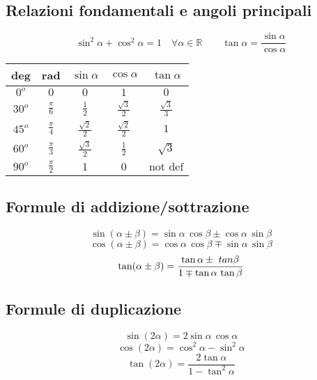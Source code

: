 \documentclass{article}
\begin{document}
  \subsection*{Relazioni fondamentali e angoli principali}
  \begin{equation*}
    \sin^2 \alpha + \cos^2 \alpha = 1 \quad \forall \alpha \in \mathbb{R}
    \qquad
    \tan\alpha = \frac{\sin\alpha}{\cos\alpha}
  \end{equation*}
  \renewcommand{\arraystretch}{1.5}
  \begin{center}
    \begin{tabular}{ | c | c | c | c | c | }
      \hline
      deg & rad & $\sin \alpha$ & $\cos\alpha$ & $\tan\alpha$ \\
      \hline
      $0^o$ & $0$ & $0$ & $1$ & $0$ \\
      $30^o$ & $\frac{\pi}{6}$ & $\frac{1}{2}$ & $\frac{\sqrt{3}}{2}$ & $\frac{\sqrt{3}}{3}$ \\
      $45^o$ & $\frac{\pi}{4}$ & $\frac{\sqrt{2}}{2}$ & $\frac{\sqrt{2}}{2}$ & $1$ \\
      $60^o$ & $\frac{\pi}{3}$ & $\frac{\sqrt{3}}{2}$ & $\frac{1}{2}$ & $\sqrt{3}$ \\
      $90^o$ & $\frac{\pi}{2}$ & $1$ & $0$ & $\text{not def}$ \\
      \hline
    \end{tabular}
  \end{center}
  \renewcommand{\arraystretch}{1}

  \subsection*{Formule di addizione/sottrazione}
  \begin{equation}
    \sin(\alpha\pm\beta) = \sin\alpha \, \cos\beta \pm \cos\alpha \, \sin\beta
  \end{equation}
  \begin{equation}
    \cos(\alpha\pm\beta) = \cos\alpha \, \cos\beta \mp \sin\alpha \, \sin\beta
  \end{equation}
  \begin{equation}
    \tan(\alpha\pm\beta) = \frac{\tan\alpha \pm \\tan\beta}{1 \mp \tan\alpha \, \tan\beta}
  \end{equation}

  \subsection*{Formule di duplicazione}
  \begin{equation}
    \sin(2\alpha) = 2 \sin\alpha \, \cos\alpha
  \end{equation}
  \begin{equation}
    \cos(2\alpha) = \cos^2 \alpha - \sin^2 \alpha
  \end{equation}
  \begin{equation}
    \tan(2\alpha) = \frac{2\tan\alpha}{1-\tan^2\alpha}
  \end{equation}
\end{document}
